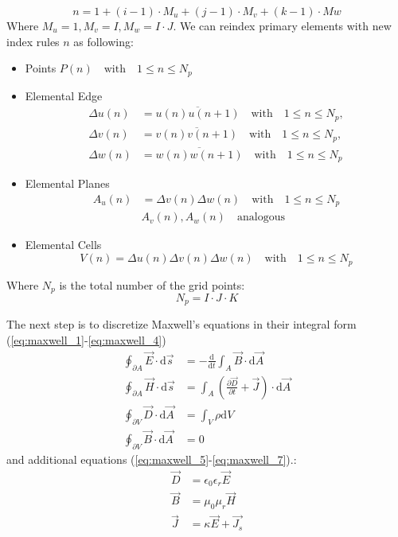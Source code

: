 \begin{equation}
n=1+(i-1)\cdot M_{u}+(j-1)\cdot M_{v}+(k-1)\cdot M{w}
\label{eq:discrete_index}
\end{equation}
Where $M_{u}=1,M_{v}=I,M_{w}=I\cdot J$. We can reindex primary elements with new index rules $n$ as following:
\begin{itemize}
\item Points $P(n) \quad \mathrm{with} \quad 1\leq n \leq N_{p}$
\item Elemental Edge
    \begin{align*}
		\Delta u(n)&=\overline{u(n)u(n+1)}  \quad \mathrm{with} \quad 1\leq n \leq N_{p}, \nonumber\\
		\Delta v(n)&=\overline{v(n)v(n+1)}  \quad \mathrm{with} \quad 1\leq n \leq N_{p}, \nonumber\\
		\Delta w(n)&=\overline{w(n)w(n+1)}  \quad \mathrm{with} \quad 1\leq n \leq N_{p}
		\end{align*}
\item Elemental Planes
		\begin{align*}
		A_{u}(n)&=\Delta v(n)\Delta w(n) \quad \mathrm{with} \quad 1\leq n\leq N_{p}\nonumber\\
		&A_{v}(n),A_{w}(n)  \quad \mathrm{analogous}
		\end{align*}
\item Elemental Cells
		\begin{equation*}
		V(n)=\Delta u(n)\Delta v(n)\Delta w(n)  \quad \mathrm{with} \quad 1\leq n\leq N_{p}
		\end{equation*}
\end{itemize}
Where $N_{p}$ is the total number of the grid points:
\begin{equation*}
N_{p}=I\cdot J\cdot K
\end{equation*}

The next step is to discretize Maxwell's equations in their integral form (\ref{eq:maxwell_1}-\ref{eq:maxwell_4}) 
\begin{align}
\oint_{\partial A}\vec{E}\cdot\mathrm{d}\vec{s}&=
-\frac{\mathrm{d}}{\mathrm{d}t}\int_{A}\vec{B}\cdot\mathrm{d}\vec{A}
\label{eq:maxwell_1}\\
\oint_{\partial A}\vec{H}\cdot\mathrm{d}\vec{s}&=
\int_{A}(\frac{\partial\vec{D}}{\partial t}+\vec{J})\cdot\mathrm{d}\vec{A}
\label{eq:maxwell_2}\\
\oint_{\partial V}\vec{D}\cdot\mathrm{d}\vec{A}&=
\int_{V}\rho\mathrm{d}V
\label{eq:maxwell_3}\\
\oint_{\partial V}\vec{B}\cdot\mathrm{d}\vec{A}&=0
\label{eq:maxwell_4}
\end{align}
and additional equations (\ref{eq:maxwell_5}-\ref{eq:maxwell_7}).:
\begin{align}
\vec{D}&=\epsilon_{0}\epsilon_{r}\vec{E}
\label{eq:maxwell_5}\\
\vec{B}&=\mu_{0}\mu_{r}\vec{H}
\label{eq:maxwell_6}\\
\vec{J}&=\kappa\vec{E}+\vec{J_{s}}
\label{eq:maxwell_7}
\end{align}
